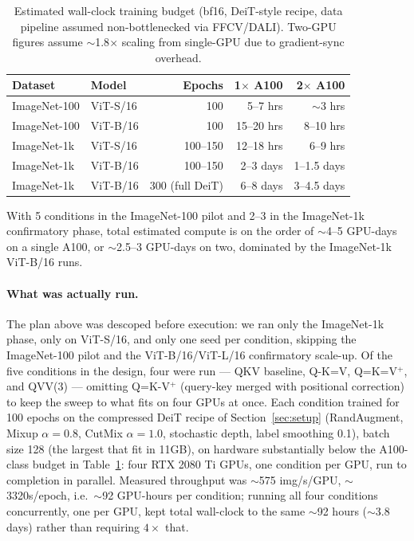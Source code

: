 \documentclass[11pt]{article}
\begin{document}
\begin{table}[h]
\centering
\caption{Estimated wall-clock training budget (bf16, DeiT-style recipe,
data pipeline assumed non-bottlenecked via FFCV/DALI). Two-GPU figures
assume $\sim$1.8$\times$ scaling from single-GPU due to gradient-sync
overhead.}
\label{tab:compute}
\begin{tabular}{@{}llrrr@{}}
\toprule
Dataset & Model & Epochs & 1$\times$ A100 & 2$\times$ A100 \\
\midrule
ImageNet-100 & ViT-S/16 & 100 & 5--7 hrs & $\sim$3 hrs \\
ImageNet-100 & ViT-B/16 & 100 & 15--20 hrs & 8--10 hrs \\
ImageNet-1k  & ViT-S/16 & 100--150 & 12--18 hrs & 6--9 hrs \\
ImageNet-1k  & ViT-B/16 & 100--150 & 2--3 days & 1--1.5 days \\
ImageNet-1k  & ViT-B/16 & 300 (full DeiT) & 6--8 days & 3--4.5 days \\
\bottomrule
\end{tabular}
\end{table}

With 5 conditions in the ImageNet-100 pilot and 2--3 in the ImageNet-1k
confirmatory phase, total estimated compute is on the order of
\(\sim\)4--5 GPU-days on a single A100, or \(\sim\)2.5--3 GPU-days on two,
dominated by the ImageNet-1k ViT-B/16 runs.

\paragraph{What was actually run.} The plan above was descoped before
execution: we ran only the ImageNet-1k phase, only on ViT-S/16, and only one
seed per condition, skipping the ImageNet-100 pilot and the ViT-B/16/ViT-L/16
confirmatory scale-up. Of the five conditions in the design, four were run
--- QKV baseline, Q-K=V, Q=K=V\(^+\), and QVV(3) --- omitting Q=K-V\(^+\)
(query-key merged with positional correction) to keep the sweep to what
fits on four GPUs at once. Each condition trained for 100 epochs on the
compressed DeiT recipe of Section~\ref{sec:setup} (RandAugment, Mixup
\(\alpha{=}0.8\), CutMix \(\alpha{=}1.0\), stochastic depth, label smoothing
0.1), batch size 128 (the largest that fit in 11GB), on hardware substantially
below the A100-class budget in Table~\ref{tab:compute}: four RTX 2080 Ti GPUs,
one condition per GPU, run to completion in parallel. Measured throughput was $\sim$575 img/s/GPU, $\sim$3320s/epoch, i.e.\
$\sim$92 GPU-hours per condition; running all four conditions concurrently,
one per GPU, kept total wall-clock to the same $\sim$92 hours ($\sim$3.8
days) rather than requiring $4\times$ that.
\end{document}
